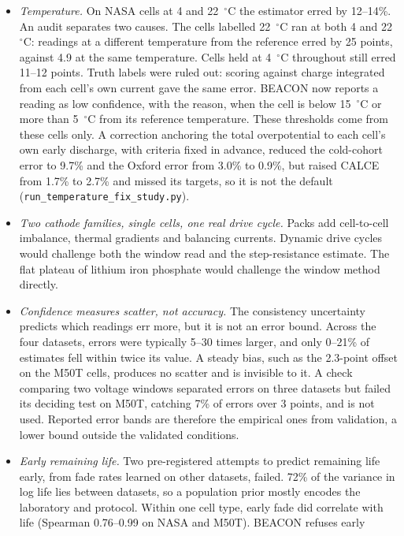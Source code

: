 \documentclass[preprint,12pt,authoryear]{elsarticle}
\begin{document}
\begin{itemize}
\item \emph{Temperature.} On NASA cells at 4 and 22~$^\circ$C the estimator
erred by 12--14\%. An audit separates two causes. The cells labelled 22~$^\circ$C
ran at both 4 and 22~$^\circ$C: readings at a different temperature from the
reference erred by 25 points, against 4.9 at the same temperature. Cells
held at 4~$^\circ$C throughout still erred 11--12 points. Truth labels were
ruled out: scoring against charge integrated from each cell's own current gave
the same error. BEACON now reports a reading as low confidence, with the
reason, when the cell is below 15~$^\circ$C or more than 5~$^\circ$C from its
reference temperature. These thresholds come from these cells only. A
correction anchoring the total overpotential to each cell's own early
discharge, with criteria fixed in advance, reduced the cold-cohort error to
9.7\% and the Oxford error from 3.0\% to 0.9\%, but raised CALCE from 1.7\% to
2.7\% and missed its targets, so it is not the default
(\texttt{run\_temperature\_fix\_study.py}).
\item \emph{Two cathode families, single cells, one real drive cycle.} Packs add
cell-to-cell imbalance, thermal gradients and balancing currents. Dynamic drive
cycles would challenge both the window read and the step-resistance estimate.
The flat plateau of lithium iron phosphate would challenge the window method
directly.
\item \emph{Confidence measures scatter, not accuracy.} The consistency
uncertainty predicts which readings err more, but it is not an error bound. Across
the four datasets, errors were typically 5--30 times larger, and only 0--21\% of
estimates fell within twice its value. A steady bias, such as the 2.3-point
offset on the M50T cells, produces no scatter and is invisible to it. A check
comparing two voltage windows separated errors on three datasets but failed its
deciding test on M50T, catching 7\% of errors over 3 points, and is not used.
Reported error bands are therefore the empirical ones from validation, a lower
bound outside the validated conditions.
\item \emph{Early remaining life.} Two pre-registered attempts to predict
remaining life early, from fade rates learned on other datasets, failed. 72\% of
the variance in log life lies between datasets, so a population prior mostly
encodes the laboratory and protocol. Within one cell type, early fade did
correlate with life (Spearman 0.76--0.99 on NASA and M50T). BEACON refuses early

\end{itemize}
\end{document}
